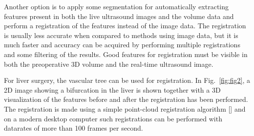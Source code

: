 \documentclass{article}[a4]
\begin{document}
Another option is to apply some segmentation for automatically
extracting features present in both the live ultrasound images and the
volume data and perform a registration of the features instead of the
image data. The registration is usually less accurate when compared to
methods using image data, but it is much faster and accuracy can be
acquired by performing multiple registrations and some filtering of
the results. Good features for registration must be visible in both
the preoperative 3D volume and the real-time ultrasound image.

For liver surgery, the vascular tree can be used for registration. In
Fig.~\ref{fig:fig2}, a 2D image showing a bifurcation in the liver is
shown together with a 3D visualization of the features before and
after the registration has been performed. The registration is made
using a simple point-cloud registration algorithm [] and on a modern
desktop computer such registrations can be performed with datarates of more than 100
frames per second.
\end{document}
